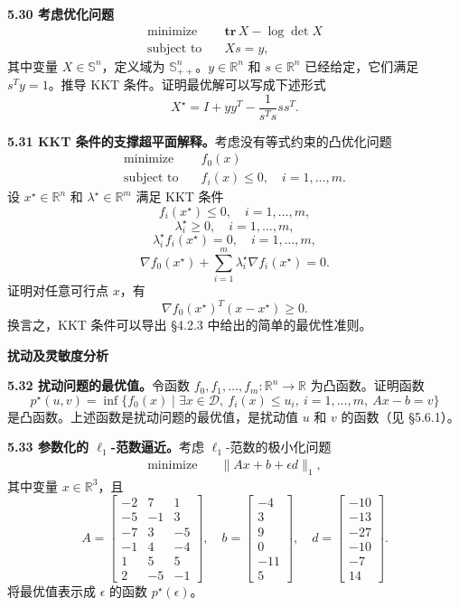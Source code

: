 \documentclass[UTF8,12pt,a4paper,fontset=fandol]{ctexart}
\begin{document}
\noindent\textbf{5.30 考虑优化问题}
\[
\begin{aligned}
\text{minimize}\quad & \mathbf{tr}\,X-\log\det X\\
\text{subject to}\quad & Xs=y,
\end{aligned}
\]
其中变量 $X\in\mathbb{S}^n$，定义域为 $\mathbb{S}_{++}^n$。$y\in\mathbb{R}^n$ 和 $s\in\mathbb{R}^n$ 已经给定，它们满足 $s^Ty=1$。推导 KKT 条件。证明最优解可以写成下述形式
\[
X^\star=I+yy^T-\frac{1}{s^Ts}ss^T.
\]

\noindent\textbf{5.31 KKT 条件的支撑超平面解释。}\quad 考虑没有等式约束的凸优化问题
\[
\begin{aligned}
\text{minimize}\quad & f_0(x)\\
\text{subject to}\quad & f_i(x)\leq 0,\quad i=1,\ldots,m.
\end{aligned}
\]
设 $x^\star\in\mathbb{R}^n$ 和 $\lambda^\star\in\mathbb{R}^m$ 满足 KKT 条件
\[
f_i(x^\star)\leq 0,\quad i=1,\ldots,m,
\]
\[
\lambda_i^\star\geq 0,\quad i=1,\ldots,m,
\]
\[
\lambda_i^\star f_i(x^\star)=0,\quad i=1,\ldots,m,
\]
\[
\nabla f_0(x^\star)+\sum_{i=1}^m\lambda_i^\star\nabla f_i(x^\star)=0.
\]
证明对任意可行点 $x$，有
\[
\nabla f_0(x^\star)^T(x-x^\star)\geq 0.
\]
换言之，KKT 条件可以导出 §4.2.3 中给出的简单的最优性准则。

\noindent\textbf{扰动及灵敏度分析}

\noindent\textbf{5.32 扰动问题的最优值。}\quad 令函数 $f_0,f_1,\ldots,f_m:\mathbb{R}^n\to\mathbb{R}$ 为凸函数。证明函数
\[
p^\star(u,v)=\inf\{f_0(x)\mid \exists x\in\mathcal{D},\ f_i(x)\leq u_i,\ i=1,\ldots,m,\ Ax-b=v\}
\]
是凸函数。上述函数是扰动问题的最优值，是扰动值 $u$ 和 $v$ 的函数（见 §5.6.1）。

\noindent\textbf{5.33 参数化的 $\ell_1$-范数逼近。}\quad 考虑 $\ell_1$-范数的极小化问题
\[
\begin{aligned}
\text{minimize}\quad & \|Ax+b+\epsilon d\|_1,
\end{aligned}
\]
其中变量 $x\in\mathbb{R}^3$，且
\[
A=
\begin{bmatrix}
-2 & 7 & 1\\
-5 & -1 & 3\\
-7 & 3 & -5\\
-1 & 4 & -4\\
1 & 5 & 5\\
2 & -5 & -1
\end{bmatrix},\quad
b=
\begin{bmatrix}
-4\\
3\\
9\\
0\\
-11\\
5
\end{bmatrix},\quad
d=
\begin{bmatrix}
-10\\
-13\\
-27\\
-10\\
-7\\
14
\end{bmatrix}.
\]
将最优值表示成 $\epsilon$ 的函数 $p^\star(\epsilon)$。
\end{document}
